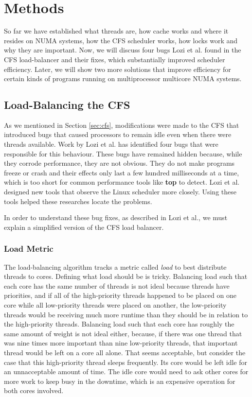 \documentclass{sig-alternate}
\begin{document}
\section{Methods}
\label{sec:methods}

So far we have established what threads are, how cache works and where it resides on NUMA systems, how the CFS scheduler works, how locks work and why they are important. Now, we will discuss four bugs Lozi et al. found in the CFS load-balancer and their fixes, which substantially improved scheduler efficiency. Later, we will show two more solutions that improve efficiency for certain kinds of programs running on multiprocessor multicore NUMA systems.

\subsection{Load-Balancing the CFS}
\label{sec:loadbalance}

As we mentioned in Section \ref{sec:cfs}, modifications were made to the CFS that introduced bugs that caused processors to remain idle even when there were threads available. Work by Lozi et al. has identified four bugs that were responsible for this behaviour. These bugs have remained hidden because, while they corrode performance, they are not obvious. They do not make programs freeze or crash and their effects only last a few hundred milliseconds at a time, which is too short for common performance tools like \textbf{top} to detect. Lozi et al. designed new tools that observe the Linux scheduler more closely. Using these tools helped these researches locate the problems.~\cite{Lozi:2016}

In order to understand these bug fixes, as described in Lozi et al., we must explain a simplified version of the CFS load balancer.~\cite{Lozi:2016}

\subsubsection{Load Metric}
\label{sec:loadmetric}

The load-balancing algorithm tracks a metric called \emph{load} to best distribute threads to cores. Defining what load should be is tricky. Balancing load such that each core has the same number of threads is not ideal because threads have priorities, and if all of the high-priority threads happened to be placed on one core while all low-priority threads were placed on another, the low-priority threads would be receiving much more runtime than they should be in relation to the high-priority threads. Balancing load such that each core has roughly the same amount of weight is not ideal either, because, if there was one thread that was nine times more important than nine low-priority threads, that important thread would be left on a core all alone. That seems acceptable, but consider the case that this high-priority thread sleeps frequently. Its core would be left idle for an unnacceptable amount of time. The idle core would need to ask other cores for more work to keep busy in the downtime, which is an expensive operation for both cores involved.~\cite{Lozi:2016}
\end{document}
